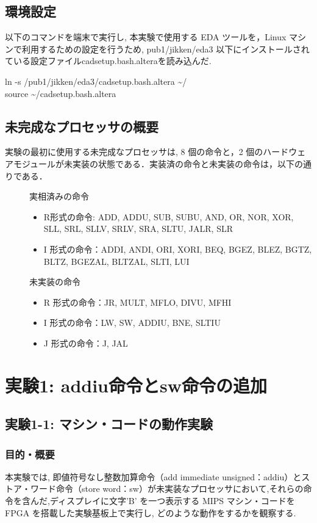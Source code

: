 \documentclass[epsf,a4paper,dvipdfmx,autodetect-engine,titlepage]{jsarticle}
\begin{document}
\subsection{環境設定}
以下のコマンドを端末で実行し, 本実験で使用する EDA ツールを，Linux マシンで利用するための設定を行うため, pub1/jikken/eda3 以下にインストールされている設定ファイルcadsetup.bash.alteraを読み込んだ. 
\begin{screen}
ln -s /pub1/jikken/eda3/cadsetup.bash.altera \~{}/　\\
source \~{}/cadsetup.bash.altera
\end{screen}
\subsection{未完成なプロセッサの概要}
実験の最初に使用する未完成なプロセッサは, 8 個の命令と，2 個のハードウェアモジュールが未実装の状態である．実装済の命令と未実装の命令は，以下の通りである．
\begin{description}
    \item[] 実相済みの命令\par
    \begin{itemize}
        \item R形式の命令: ADD, ADDU, SUB, SUBU, AND, OR, NOR, XOR, SLL, SRL, SLLV, SRLV, SRA, SLTU, JALR, SLR
        \item I 形式の命令：ADDI, ANDI, ORI, XORI, BEQ, BGEZ, BLEZ, BGTZ, BLTZ, BGEZAL, BLTZAL, SLTI, LUI
    \end{itemize}
    \item[] 未実装の命令\par
    \begin{itemize}
        \item R 形式の命令：JR, MULT, MFLO, DIVU, MFHI
        \item I 形式の命令：LW, SW, ADDIU, BNE, SLTIU
        \item J 形式の命令：J, JAL
    \end{itemize}
\end{description}

\section{実験1: addiu命令とsw命令の追加}
\subsection{実験1-1: マシン・コードの動作実験}
\subsubsection{目的・概要}
本実験では, 即値符号なし整数加算命令（add immediate unsigned：addiu）とストア・ワード命令（store word：sw）が未実装なプロセッサにおいて,それらの命令を含んだ,ディスプレイに文字’B’ を一つ表示する MIPS マシン・コードをFPGA を搭載した実験基板上で実行し, どのような動作をするかを観察する.
\end{document}
